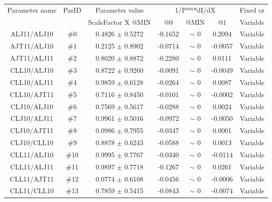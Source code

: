 \begin{table}[H]
\scriptsize
\begin{center}
\renewcommand{\arraystretch}{1.1}
\begin{tabular}{|c|c|c|ccc|c|}
\hline
Parameter name & ParID & Parameter value &\multicolumn{3}{|c|}{1/I$^\mathrm{nom}$*dI/dX} & Fixed or\\
 & & ScaleFactor X @MIN & @0 & @MIN & @1 & Variable\\
\hline
 {\tiny ALJ11/ALJ10} & \#0 &    0.4826 $\pm$    0.5272 &   -0.1652 & {\tiny $\sim$ }0 &    0.2094 & Variable \\
 {\tiny AJT11/ALJ10} & \#1 &    0.2125 $\pm$    0.8902 &   -0.0714 & {\tiny $\sim$ }0 &   -0.0057 & Variable \\
 {\tiny AJT11/ALJ11} & \#2 &    0.8020 $\pm$    0.8872 &   -0.2280 & {\tiny $\sim$ }0 &    0.0111 & Variable \\
 {\tiny CLL10/ALJ10} & \#3 &    0.8722 $\pm$    0.9260 &   -0.0091 & {\tiny $\sim$ }0 &   -0.0049 & Variable \\
 {\tiny CLL10/ALJ11} & \#4 &    0.9859 $\pm$    0.6128 &   -0.0264 & {\tiny $\sim$ }0 &    0.0087 & Variable \\
 {\tiny CLL10/AJT11} & \#5 &    0.7116 $\pm$    0.8450 &   -0.0101 & {\tiny $\sim$ }0 &   -0.0002 & Variable \\
 {\tiny CLJ10/ALJ10} & \#6 &    0.7569 $\pm$    0.5617 &   -0.0288 & {\tiny $\sim$ }0 &    0.0024 & Variable \\
 {\tiny CLJ10/ALJ11} & \#7 &    0.9961 $\pm$    0.5016 &   -0.0972 & {\tiny $\sim$ }0 &   -0.0050 & Variable \\
 {\tiny CLJ10/AJT11} & \#8 &    0.0986 $\pm$    0.7955 &   -0.0347 & {\tiny $\sim$ }0 &    0.0001 & Variable \\
 {\tiny CLJ10/CLL10} & \#9 &    0.8878 $\pm$    0.6243 &   -0.0588 & {\tiny $\sim$ }0 &    0.0013 & Variable \\
 {\tiny CLL11/ALJ10} & \#10 &    0.9995 $\pm$    0.7767 &   -0.0340 & {\tiny $\sim$ }0 &   -0.0114 & Variable \\
 {\tiny CLL11/ALJ11} & \#11 &    0.9897 $\pm$    0.7718 &   -0.1267 & {\tiny $\sim$ }0 &    0.0261 & Variable \\
 {\tiny CLL11/AJT11} & \#12 &    0.0774 $\pm$    0.6108 &   -0.0456 & {\tiny $\sim$ }0 &   -0.0006 & Variable \\
 {\tiny CLL11/CLL10} & \#13 &    0.7859 $\pm$    0.5415 &   -0.0843 & {\tiny $\sim$ }0 &   -0.0074 & Variable \\

\end{tabular}
\end{center}
\end{table}
